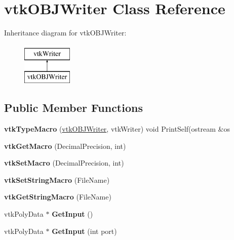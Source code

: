 \hypertarget{classvtk_o_b_j_writer}{}\section{vtk\+O\+B\+J\+Writer Class Reference}
\label{classvtk_o_b_j_writer}
Inheritance diagram for vtk\+O\+B\+J\+Writer\+:\begin{figure}[H]
\begin{center}
\leavevmode
\includegraphics[height=2.000000cm]{classvtk_o_b_j_writer}
\end{center}
\end{figure}
\subsection*{Public Member Functions}
\begin{DoxyCompactItemize}
\item 
\hypertarget{classvtk_o_b_j_writer_a655c7fbda2053642f51971b63645c71a}{}{\bfseries vtk\+Type\+Macro} (\hyperlink{classvtk_o_b_j_writer}{vtk\+O\+B\+J\+Writer}, vtk\+Writer) void Print\+Self(ostream \&os\label{classvtk_o_b_j_writer_a655c7fbda2053642f51971b63645c71a}

\item 
\hypertarget{classvtk_o_b_j_writer_af429ca64c335bdd44aaca7e942415cae}{}{\bfseries vtk\+Get\+Macro} (Decimal\+Precision, int)\label{classvtk_o_b_j_writer_af429ca64c335bdd44aaca7e942415cae}

\item 
\hypertarget{classvtk_o_b_j_writer_a84a25992e29c7d26aa46a1b8296a1a65}{}{\bfseries vtk\+Set\+Macro} (Decimal\+Precision, int)\label{classvtk_o_b_j_writer_a84a25992e29c7d26aa46a1b8296a1a65}

\item 
\hypertarget{classvtk_o_b_j_writer_a5f8fda9a9c917d7a2080e41cf6793d9a}{}{\bfseries vtk\+Set\+String\+Macro} (File\+Name)\label{classvtk_o_b_j_writer_a5f8fda9a9c917d7a2080e41cf6793d9a}

\item 
\hypertarget{classvtk_o_b_j_writer_a53fa84d4b8f4aff0f77d20bbd1099eee}{}{\bfseries vtk\+Get\+String\+Macro} (File\+Name)\label{classvtk_o_b_j_writer_a53fa84d4b8f4aff0f77d20bbd1099eee}

\item 
\hypertarget{classvtk_o_b_j_writer_a7e4da5f3993256b791be4201169a38fc}{}vtk\+Poly\+Data $\ast$ {\bfseries Get\+Input} ()\label{classvtk_o_b_j_writer_a7e4da5f3993256b791be4201169a38fc}

\item 
\hypertarget{classvtk_o_b_j_writer_a6150756948c290d37c1c437e1d24da7b}{}vtk\+Poly\+Data $\ast$ {\bfseries Get\+Input} (int port)\label{classvtk_o_b_j_writer_a6150756948c290d37c1c437e1d24da7b}

\end{DoxyCompactItemize}
